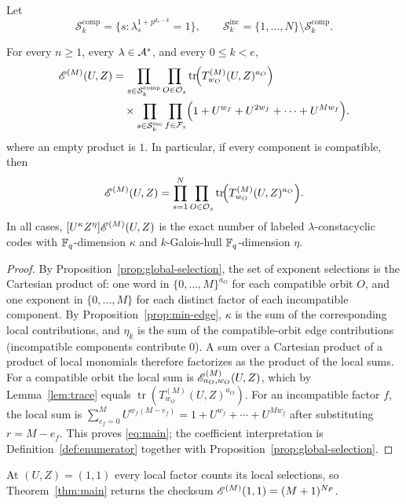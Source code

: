 Let
{\small
\[
\mathcal{S}_k^{\mathrm{comp}}
 =\{s:\lambda_s^{1+p^{d_s-k}}=1\},
\qquad
\mathcal{S}_k^{\mathrm{inc}}=\{1,\ldots,N\}\setminus
                               \mathcal{S}_k^{\mathrm{comp}} .
\]
}
\begin{theorem}\label{thm:main}
For every $n\geq1$, every $\lambda\in\mathcal A^\ast$, and every $0\leq k<e$,
{\small
\begin{align}
\mathscr E^{(M)}(U,Z)
&=\prod_{s\in\mathcal{S}_k^{\mathrm{comp}}}
  \prod_{O\in\mathcal O_s}
  \operatorname{tr}\!\Bigl(
  T^{(M)}_{w_O}(U,Z)^{a_O}
  \Bigr)\notag\\
&\quad\times
  \prod_{s\in\mathcal{S}_k^{\mathrm{inc}}}
  \prod_{f\in\mathcal F_s}
  \Bigl(1+U^{w_f}+U^{2w_f}
  +\cdots+U^{Mw_f}\Bigr).
\label{eq:main}
\end{align}
}
where an empty product is $1$.  In particular, if every component is
compatible, then
\[
\mathscr E^{(M)}(U,Z)
 =\prod_{s=1}^{N}\prod_{O\in\mathcal O_s}
   \operatorname{tr}\!\Bigl(T^{(M)}_{w_O}(U,Z)^{a_O}\Bigr).
\]
In all cases, $[U^\kappa Z^\eta]\mathscr E^{(M)}(U,Z)$ is the exact number of labeled
$\lambda$-constacyclic codes with $\mathbb F_q$-dimension $\kappa$ and
$k$-Galois-hull $\mathbb F_q$-dimension $\eta$.
\end{theorem}

\begin{proof}
By Proposition~\ref{prop:global-selection}, the set of exponent selections is
the Cartesian product of: one word in $\{0,\ldots,M\}^{a_O}$ for each
compatible orbit $O$, and one exponent in $\{0,\ldots,M\}$ for each distinct
factor of each incompatible component.  By
Proposition~\ref{prop:min-edge}, $\kappa$ is the sum of the corresponding
local contributions, and $\eta_k$ is the sum of the compatible-orbit edge
contributions (incompatible components contribute $0$).  A sum over a Cartesian
product of a product of local monomials therefore factorizes as the product of
the local sums.  For a compatible orbit the local sum is
$\mathscr E_{a_O,w_O}^{(M)}(U,Z)$, which by Lemma~\ref{lem:trace} equals
$\operatorname{tr}(T^{(M)}_{w_O}(U,Z)^{a_O})$.  For an incompatible factor
$f$, the local sum is
$\sum_{e_f=0}^{M}U^{w_f(M-e_f)}
 =1+U^{w_f}+\cdots+U^{Mw_f}$ after substituting $r=M-e_f$.  This proves
\eqref{eq:main}; the coefficient interpretation is
Definition~\ref{def:enumerator} together with
Proposition~\ref{prop:global-selection}.
\end{proof}

At $(U,Z)=(1,1)$ every local factor counts its local selections, so
Theorem~\ref{thm:main} returns the checksum
$\mathscr E^{(M)}(1,1)=(M+1)^{N_F}$.

